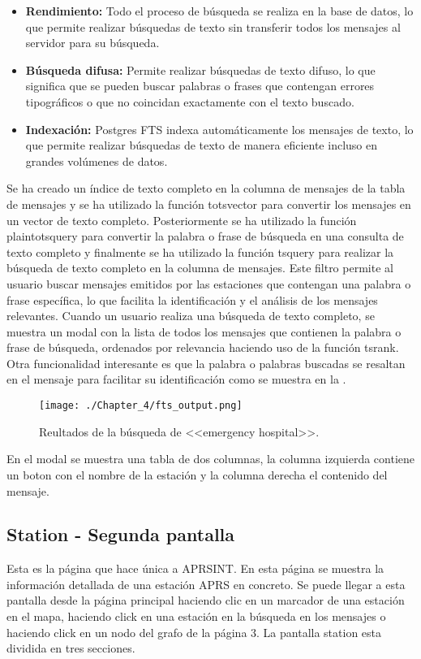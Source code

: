 \begin{itemize}
	\item \textbf{Rendimiento:} Todo el proceso de búsqueda se realiza en la base de datos, lo que permite realizar búsquedas de texto sin transferir todos los mensajes al servidor para su búsqueda.
	\item \textbf{Búsqueda difusa:} Permite realizar búsquedas de texto difuso, lo que significa que se pueden buscar palabras o frases que contengan errores tipográficos o que no coincidan exactamente con el texto buscado.
	\item \textbf{Indexación:} Postgres FTS indexa automáticamente los mensajes de texto, lo que permite realizar búsquedas de texto de manera eficiente incluso en grandes volúmenes de datos. 
\end{itemize}
Se ha creado un índice de texto completo en la columna de mensajes de la tabla de mensajes y se ha utilizado la función to\textunderscore tsvector para convertir los mensajes en un vector de texto completo. Posteriormente se ha utilizado la función plainto\textunderscore tsquery para convertir la palabra o frase de búsqueda en una consulta de texto completo y finalmente se ha utilizado la función ts\textunderscore query para realizar la búsqueda de texto completo en la columna de mensajes. Este filtro permite al usuario buscar mensajes emitidos por las estaciones que contengan una palabra o frase específica, lo que facilita la identificación y el análisis de los mensajes relevantes. 
Cuando un usuario realiza una búsqueda de texto completo, se muestra un modal con la lista de todos los mensajes que contienen la palabra o frase de búsqueda, ordenados por relevancia haciendo uso de la función ts\textunderscore rank. Otra funcionalidad interesante es que la palabra o palabras buscadas se resaltan en el mensaje para facilitar su identificación como se muestra en la .

\begin{figure}[h]
	\centering
	\texttt{[image: ./Chapter\_4/fts\_output.png]}
	\caption{Reultados de la búsqueda de <<emergency hospital>>.}
	\label{fig:postgres-fts}
\end{figure}

En el modal se muestra una tabla de dos columnas, la columna izquierda contiene un boton con el nombre de la estación y la columna derecha el contenido del mensaje.

\subsection{Station - Segunda pantalla}
Esta es la página que hace única a APRSINT. En esta página se muestra la información detallada de una estación APRS en concreto. Se puede llegar a esta pantalla desde la página principal haciendo clic en un marcador de una estación en el mapa, haciendo click en una estación en la búsqueda en los mensajes o haciendo click en un nodo del grafo de la página 3. La pantalla station esta dividida en tres secciones.


